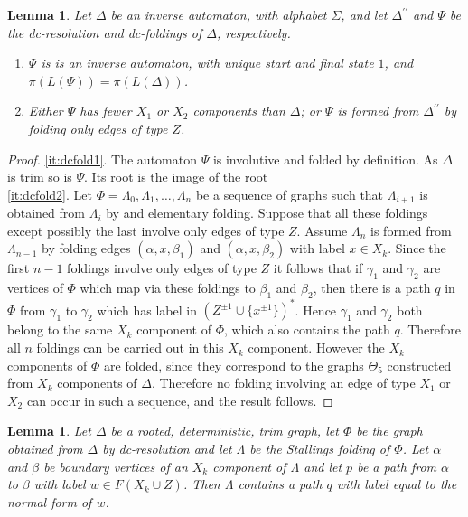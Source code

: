 \documentclass[a4paper,12pt]{article}
\renewcommand{\a}{\alpha }
\renewcommand{\b}{\beta }
\newcommand{\g}{\gamma }
\newcommand{\D}{\Delta }
\newcommand{\T}{\Theta }
\renewcommand{\L}{\Lambda }
\renewcommand{\S}{\Sigma }
\newtheorem{lemma}[theorem]{Lemma}
\numberwithin{equation}{section}
\numberwithin{figure}{section}
\newcommand{\be}{\begin{enumerate}}
\newcommand{\ee}{\end{enumerate}}
\begin{document}
\begin{lemma}
Let $\D$ be  an inverse automaton, 
with alphabet $\S$, 
and let $\D^{\prime\prime}$  and 
$\Psi$ be the dc-resolution and dc-foldings of $\D$, 
respectively.
\be
\item \label{it:dcfold1}
$\Psi$ is 
is an inverse automaton, with unique start and  final state $1$, and 
$\pi(L(\Psi))=\pi(L(\D))$. 
\item \label{it:dcfold2} Either $\Psi$ has fewer $X_1$ or $X_2$ components than
$\D$; or $\Psi$ is formed from $\D^{\prime\prime}$ by folding only
edges of type $Z$.
\ee
\end{lemma}
\begin{proof}
\ref{it:dcfold1}.  
The automaton $\Psi$ is involutive and folded by definition. As 
$\D$ is trim so is $\Psi$. Its root is the image of the root 
 \\[1em]
\ref{it:dcfold2}. 
Let $\Phi=\L_0,\L_1,\ldots, \L_n$ be a sequence of graphs such that
$\L_{i+1}$ is obtained from $\L_i$ by and elementary folding.
Suppose that all these foldings except possibly the last involve only edges
of type $Z$. Assume $\L_n$ is formed from $\L_{n-1}$ by folding edges
$(\a,x,\b_1)$ and $(\a,x,\b_2)$ with label $x\in X_k$. Since the
first $n-1$ foldings involve only edges of type $Z$ it follows that
if $\g_1$ and $\g_2$ are vertices of $\Phi$ which map via these foldings
to $\b_1$ and $\b_2$, then there is a path $q$ in $\Phi$ from $\g_1$ to $\g_2$
which has label in $(Z^{\pm 1}\cup \{x^{\pm 1}\})^\ast$. Hence $\g_1$ and $\g_2$ both belong to
 the same $X_k$ component of $\Phi$, which also contains the path $q$.
Therefore all $n$ foldings can be carried out in this $X_k$
component. However the $X_k$ components of $\Phi$ are folded, since they
correspond to the graphs $\T_5$ constructed from $X_k$ components of $\D$.
Therefore no folding involving an edge of type $X_1$ or $X_2$ can occur
in such a sequence, and the result follows.
\end{proof}
\begin{lemma}
Let $\D$ be  a rooted, deterministic, trim graph,  let $\Phi$ be
the graph
obtained from $\D$ by dc-resolution %
and let
$\L$ be the Stallings folding of $\Phi$. Let $\a$  and $\b$ be boundary
vertices of an $X_k$ component of $\L$ and let $p$ be a path from
$\a$ to $\b$ with label $w\in F(X_k\cup Z)$. Then $\L$ contains a
path $q$ with label equal to the normal form of $w$.
\end{lemma}
\end{document}
